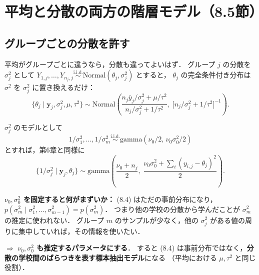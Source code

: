 \documentclass[lualatex,ja=standard,a4paper,12pt]{bxjsarticle}
\begin{document}
\section{平均と分散の両方の階層モデル（8.5節）}

\subsection{グループごとの分散を許す}

平均がグループごとに違うなら，分散も違ってよいはず．
グループ $j$ の分散を $\sigma_j^2$ として $Y_{1,j}, \ldots, Y_{n_j,j} \overset{\text{i.i.d.}}{\sim} \mathrm{Normal}(\theta_j, \sigma_j^2)$ とすると，
$\theta_j$ の完全条件付き分布は $\sigma^2$ を $\sigma_j^2$ に置き換えるだけ：
\[
  \{\theta_j \mid \bm{y}_j, \sigma_j^2, \mu, \tau^2\} \sim
  \mathrm{Normal}\!\left(\frac{n_j\bar{y}_j/\sigma_j^2 + \mu/\tau^2}{n_j/\sigma_j^2 + 1/\tau^2},\;
  \bigl[n_j/\sigma_j^2 + 1/\tau^2\bigr]^{-1}\right).
\]

$\sigma_j^2$ のモデルとして
\[
  1/\sigma_1^2, \ldots, 1/\sigma_m^2 \overset{\text{i.i.d.}}{\sim} \mathrm{gamma}(\nu_0/2,\, \nu_0\sigma_0^2/2) \tag{8.4}
\]
とすれば，第6章と同様に
\[
  \{1/\sigma_j^2 \mid \bm{y}_j, \theta_j\} \sim
  \mathrm{gamma}\!\left(\frac{\nu_0 + n_j}{2},\; \frac{\nu_0\sigma_0^2 + \sum_i (y_{i,j} - \theta_j)^2}{2}\right).
\]

\begin{pointbox}
\textbf{$\nu_0, \sigma_0^2$ を固定すると何がまずいか：}
(8.4) はただの事前分布になり，$p(\sigma_m^2 \mid \sigma_1^2, \ldots, \sigma_{m-1}^2) = p(\sigma_m^2)$．
つまり他の学校の分散から学んだことが $\sigma_m^2$ の推定に使われない．
グループ $m$ のサンプルが少なく，他の $\sigma_j^2$ がある値の周りに集中していれば，その情報を使いたい．

\medskip
$\Rightarrow$ \textbf{$\nu_0, \sigma_0^2$ も推定するパラメータにする}．
すると (8.4) は事前分布ではなく，\textbf{分散の学校間のばらつきを表す標本抽出モデル}になる
（平均における $\mu, \tau^2$ と同じ役割）．
\end{pointbox}
\end{document}
